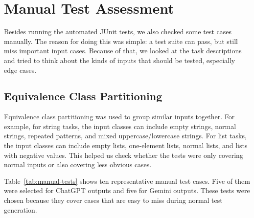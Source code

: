\documentclass[journal]{IEEEtran}
\begin{document}
\section{Manual Test Assessment}

Besides running the automated JUnit tests, we also checked some test cases manually. The reason for doing this was simple: a test suite can pass, but still miss important input cases. Because of that, we looked at the task descriptions and tried to think about the kinds of inputs that should be tested, especially edge cases.

\subsection{Equivalence Class Partitioning}

Equivalence class partitioning was used to group similar inputs together. For example, for string tasks, the input classes can include empty strings, normal strings, repeated patterns, and mixed uppercase/lowercase strings. For list tasks, the input classes can include empty lists, one-element lists, normal lists, and lists with negative values. This helped us check whether the tests were only covering normal inputs or also covering less obvious cases.

Table~\ref{tab:manual-tests} shows ten representative manual test cases. Five of them were selected for ChatGPT outputs and five for Gemini outputs. These tests were chosen because they cover cases that are easy to miss during normal test generation.
\end{document}
